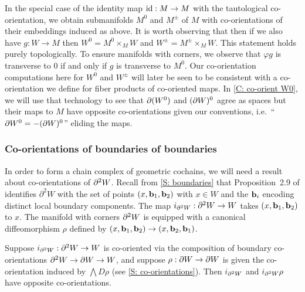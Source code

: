 \begin{example}
In the special case of the identity map  $\mathrm{id}:M\to M$ with the tautological co-orientation, we obtain submanifolds $M^0$ and $M^{\pm}$ of $M$ with co-orientations of their embeddings induced as above. It is worth observing that then if we also have $g:W\to M$ then $W^0=M^0\times_M W$ and $W^{\pm}=M^{\pm}\times_M W$. This statement holds purely topologically. To ensure manifolds with corners, we observe that $\varphi g$ is transverse to $0$ if and only if $g$ is transverse to $M^0$. Our co-orientation computations here for $W^0$ and $W^\pm$ will later be seen to be consistent with a co-orientation we define for fiber products of co-oriented maps. In \cref{C: co-orient W0}, we will use that technology to see that $\partial (W^0)$ and $(\partial W)^0$ agree as spaces but their maps to $M$ have opposite co-orientations given our conventions, i.e.\  ``$\partial W^0=-(\partial W)^0$'' eliding the maps.



\begin{comment}
\red{TO DO SOMEWHERE: It will be convenient to show that $g:W^0\to M$ with this co-orientation is the pullback of $M^0\into M$ (co-oriented as defined here) and $g:W\to M$ and similarly for $g:W^\pm\to M$. Also need to rewrite things in other places as $M^0$, $M^\pm$, etc instead of always writing $\varphi^{-1}((\infty,0])$ etc. Also need to show that $\bd W^0=-(\bd W)^0$, which should follow from the Leibniz rule and the first thing the previous sentence.}
\end{comment}
\end{example}
 


\subsubsection{Co-orientations of boundaries of boundaries} In order to form a chain complex of geometric cochains, we will need a result about co-orientations of $\partial^2W$. Recall from \cref{S: boundaries} that Proposition~2.9 of \cite{Joy12} identifies $\partial^2 W$ with the set of points $(x,\mathbf{b}_1,\mathbf{b}_2)$ with $x\in W$ and the $\mathbf{b}_i$ encoding distinct local boundary components.  The map $i_{\partial^2W}:\partial^2W\to W$ takes $(x,\mathbf{b}_1,\mathbf{b}_2)$ to $x$.
The manifold with corners $\partial^2W$ is equipped with a canonical diffeomorphism $\rho$ defined by $(x,\mathbf{b}_1,\mathbf{b}_2)\to (x,\mathbf{b}_2,\mathbf{b}_1)$.



\begin{lemma}\label{L: boundary2}
Suppose $i_{\partial^2W}:\partial^2W\to W$ is co-oriented via the composition of boundary co-orientations $\partial^2W\to \partial W\to W$, and suppose $\rho:\partial W\to \partial W$ is given the co-orientation induced by  $\bigwedge D\rho$ (see \cref{S: co-orientations}). Then $i_{\partial^2W}$ and $i_{\partial^2W}\rho$ have opposite co-orientations. 
\end{lemma}

